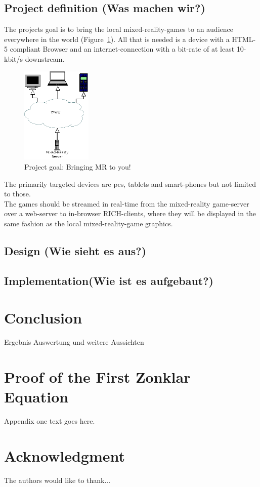 \documentclass[journal]{IEEEtran}
\begin{document}
\subsection{Project definition (Was machen wir?)}
The projects goal is to bring the local mixed-reality-games to an audience everywhere in the world (Figure~\ref{fig:proj_goal}). All that is needed is a device with a HTML-5 compliant Browser and an internet-connection with a bit-rate of at least 10-kbit/s downstream.
\begin{figure}[!t]
    \centering
    \includegraphics[width=0.3\textwidth]{project-target.png}
    \caption{Project goal: Bringing MR to you!}
    \label{fig:proj_goal}
\end{figure}
The primarily targeted devices are pcs, tablets and smart-phones but not limited to those. \\
The games should be streamed in real-time from the mixed-reality game-server over a web-server to in-browser RICH-clients, where they will be displayed in the same fashion as the local mixed-reality-game graphics.
\subsection{Design (Wie sieht es aus?)}


\subsection{Implementation(Wie ist es aufgebaut?)}


\section{Conclusion}
Ergebnis Auswertung und weitere Aussichten

\appendices
\section{Proof of the First Zonklar Equation}
Appendix one text goes here.

\section*{Acknowledgment}

The authors would like to thank...

\end{document}
